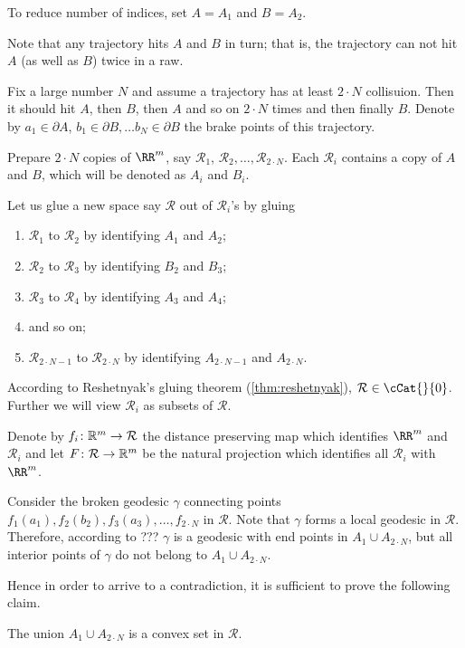  To reduce number of indices, set $A=A_1$ and $B=A_2$. 

Note that any trajectory hits $A$ and $B$ in turn;
that is, the trajectory can not hit $A$ (as well as $B$)
twice in a raw.

Fix a large number $N$ and assume a trajectory has at least $2\cdot N$ collisuion.
Then it should hit $A$,
then $B$,
then $A$
and so on $2\cdot N$ times
and then finally $B$.
Denote by 
$a_1\in \partial A$, 
$b_1\in \partial B,
\dots
b_N\in \partial B$
the brake points of this trajectory.

Prepare $2\cdot N$ copies of $\RR^m$,
say $\mathcal{R}_1$, $\mathcal{R}_2,\dots,\mathcal{R}_{2\cdot N}$.
Each $\mathcal{R}_i$ contains a copy of $A$ and $B$, which will be denoted as $A_i$ and $B_i$.

Let us glue a new space say $\mathcal{R}$ out of $\mathcal{R}_i$'s
by gluing 
\begin{enumerate}
\item $\mathcal{R}_1$ to $\mathcal{R}_2$ by identifying $A_1$ and $A_2$;
\item $\mathcal{R}_2$ to $\mathcal{R}_3$  by identifying $B_2$ and $B_3$;
\item $\mathcal{R}_3$ to $\mathcal{R}_4$  by identifying $A_3$ and $A_4$;
\item and so on;
\item $\mathcal{R}_{2\cdot N-1}$ to $\mathcal{R}_{2\cdot N}$ by identifying $A_{2\cdot N-1}$ and $A_{2\cdot N}$.
\end{enumerate}
According to Reshetnyak's gluing theorem (\ref{thm:reshetnyak}), $\mathcal{R}\in\cCat{}{0}$.
Further we will view $\mathcal{R}_i$ as subsets of $\mathcal{R}$.

Denote by $f_i\:\RR^m\to\mathcal{R}$ the distance preserving map which identifies $\RR^m$ and $\mathcal{R}_i$
and let $F\:\mathcal{R} \to \RR^m$ be the natural projection which identifies all $\mathcal{R}_i$ with $\RR^m$.

Consider the broken geodesic $\gamma$ connecting points $f_1(a_1),f_2(b_2),f_3(a_3),\dots,f_{2\cdot N}$ in $\mathcal{R}$.
Note that $\gamma$ forms a local geodesic in $\mathcal{R}$.
Therefore, according to ??? $\gamma$ is a geodesic with end points in $A_1\cup A_{2\cdot N}$,
but all interior points of $\gamma$ do not belong to $A_1\cup A_{2\cdot N}$.

Hence in order to arrive to a contradiction, 
it is sufficient to prove the following claim.
 
\begin{clm}{}
The union $A_1\cup A_{2\cdot N}$ is a convex set in $\mathcal{R}$.
\end{clm}


